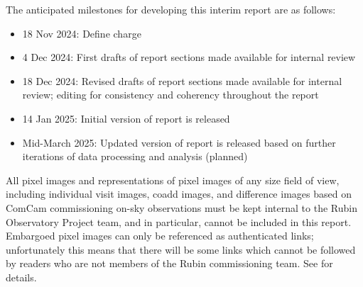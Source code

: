 The anticipated milestones for developing this interim report are as follows:

\begin{itemize}

    \item 18 Nov 2024: Define charge

    \item 4 Dec 2024: First drafts of report sections made available for internal review

    \item 18 Dec 2024: Revised drafts of report sections made available for internal review; editing for consistency and coherency throughout the report

    \item 14 Jan 2025: Initial version of report is released

    \item Mid-March 2025: Updated version of report is released based on further iterations of data processing and analysis (planned)

\end{itemize}

\begin{warning}
    All pixel images and representations of pixel images of any size field of view, including individual visit images, coadd images, and difference images based on ComCam commissioning on-sky observations must be kept internal to the Rubin Observatory Project team, and in particular, cannot be included in this report.
    Embargoed pixel images can only be referenced as authenticated links; unfortunately this means that
    there will be some links which cannot be followed by readers who are not members of the
    Rubin commissioning team.
    See  for details.
\end{warning}